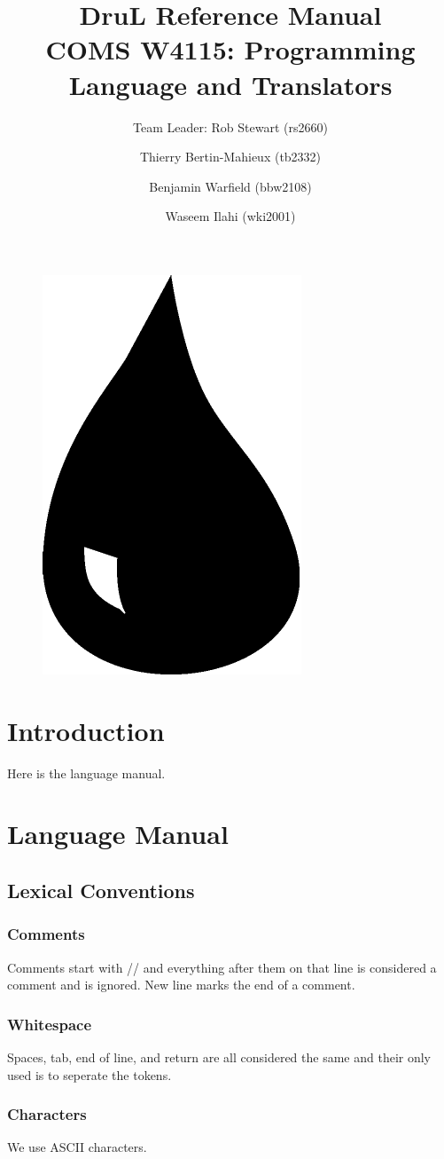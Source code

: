 \documentclass[11pt,twoside]{article}
\title{\textbf{DruL} Reference Manual\\
\vspace{1cm}
COMS W4115: Programming Language and Translators}
\author{Team Leader: Rob Stewart (rs2660) \and Thierry Bertin-Mahieux (tb2332) \and Benjamin Warfield (bbw2108) \and Waseem Ilahi (wki2001)}
\begin{document}
\maketitle
\begin{center}
\end{center}

\vspace{3cm}

\begin{figure}[h]
\begin{center}
\includegraphics[width=.2\columnwidth]{Water_Drop.pdf}
\end{center}
\end{figure}


\newpage


\section{Introduction}
Here is the language manual.


\section{Language Manual}

\subsection{Lexical Conventions}

\subsubsection{Comments}
Comments start with // and everything after them on that line
is considered a comment and is ignored. New line marks the end
of a comment.
\subsubsection{Whitespace}
Spaces, tab, end of line, and return are all considered the same 
and their only used is to seperate the tokens.

\subsubsection{Characters}
We use ASCII characters.
\end{document}
